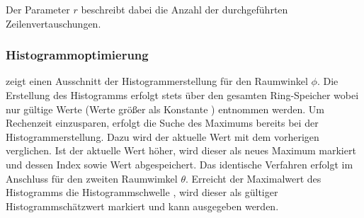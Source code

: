 Der Parameter $r$ beschreibt dabei die Anzahl der durchgeführten Zeilenvertauschungen. 








    









\subsubsection{Histogrammoptimierung}
 zeigt einen Ausschnitt der Histogrammerstellung für den Raumwinkel $\phi$. Die Erstellung des Histogramms erfolgt stets über den gesamten Ring-Speicher wobei nur gültige Werte (Werte größer als Konstante ) entnommen werden. Um Rechenzeit einzusparen, erfolgt die Suche des Maximums bereits bei der Histogrammerstellung. Dazu wird der aktuelle Wert mit dem vorherigen verglichen. Ist der aktuelle Wert höher, wird dieser als neues Maximum markiert und dessen Index sowie Wert abgespeichert. Das identische Verfahren erfolgt im Anschluss für den zweiten Raumwimkel $\theta$. Erreicht der Maximalwert des Histogramms die Histogrammschwelle , wird dieser als gültiger Histogrammschätzwert markiert und kann ausgegeben werden.


